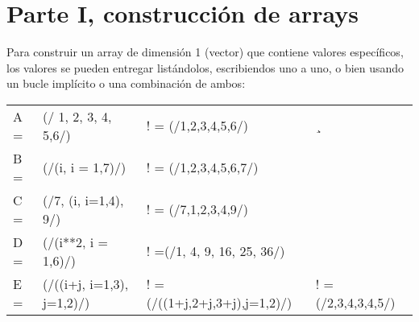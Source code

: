 \documentclass[11pt]{exam}
\begin{document}
\firstpageheadrule
\runningheadrule
{}
\cfoot{ }
\begin{flushleft}
\vspace{0.2in}

\vspace{0.25cm}
\end{flushleft}

\section{Parte I, construcci\'on de arrays}
Para  construir un array de dimensi\'on 1 (vector) que contiene valores espec\'ificos, los valores se pueden entregar list\'andolos, escribiendos uno a uno, o bien usando un bucle impl\'icito o una combinaci\'on de ambos:
\begin{center}
\begin{tabular}{llll}
A = &(/ 1, 2, 3, 4, 5,6/) 		&! = (/1,2,3,4,5,6/) &¸\\
B = &(/(i, i = 1,7)/)         		&! = (/1,2,3,4,5,6,7/)&\\
C = &(/7, (i, i=1,4), 9/)     		&! = (/7,1,2,3,4,9/) & \\
D = &(/(i**2, i = 1,6)/)		&! =(/1, 4, 9, 16, 25, 36/) & \\
E = &(/((i+j, i=1,3), j=1,2)/)		&! = (/((1+j,2+j,3+j),j=1,2)/)	&! = (/2,3,4,3,4,5/) 
\end{tabular} 
\end{center}
\end{document}
